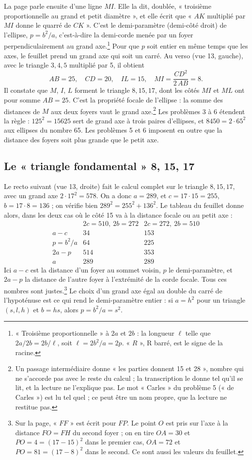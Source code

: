 \documentclass[11pt,a4paper]{article}
\begin{document}
La page parle ensuite d'une ligne \(MI\). Elle la dit, doublée, « troisième
proportionnelle au grand et petit diamètre », et elle écrit que « \(AK\)
multiplié par \(MI\) donne le quarré de \(CK\) ». C'est le demi-paramètre
(demi-côté droit) de l'ellipse, \(p=b^2/a\), c'est-à-dire la demi-corde menée
par un foyer perpendiculairement au grand axe.\footnote{« Troisième
proportionnelle » à \(2a\) et \(2b\) : la longueur \(\ell\) telle que
\(2a/2b=2b/\ell\), soit \(\ell=2b^2/a=2p\). « \(R\) », R barré, est le signe de
la racine.} Pour que \(p\) soit entier en même temps que les axes, le feuillet
prend un grand axe qui soit un carré. Au verso (vue 13, gauche), avec le
triangle \(3,4,5\) multiplié par 5, il obtient
\[
AB=25,\quad CD=20,\quad IL=15,\quad MI=\frac{CD^2}{2\,AB}=8 .
\]
Il constate que \(M\), \(I\), \(L\) forment le triangle \(8,15,17\), dont les
côtés \(MI\) et \(ML\) ont pour somme \(AB=25\). C'est la propriété focale de
l'ellipse : la somme des distances de \(M\) aux deux foyers vaut le grand
axe.\footnote{Un passage intermédiaire donne « les parties donnent 15 et 28 »,
nombre qui ne s'accorde pas avec le reste du calcul ; la transcription le donne
tel qu'il se lit, et la lecture ne l'explique pas. Le mot « Carles » du
problème 5 (« de Carles ») est lu tel quel ; ce peut être un nom propre, que
la lecture ne restitue pas.} Les problèmes 3 à 6 étendent la règle : \(125^2
=15625\) sert de grand axe à trois paires d'ellipses, et \(8450=2\cdot65^2\)
aux ellipses du nombre 65. Les problèmes 5 et 6 imposent en outre que la
distance des foyers soit plus grande que le petit axe.

\subsection*{Le « triangle fondamental » 8, 15, 17}

Le recto suivant (vue 13, droite) fait le calcul complet sur le triangle
\(8,15,17\), avec un grand axe \(2\cdot17^2=578\). On a donc \(a=289\), et
\(c=17\cdot15=255\), \(b=17\cdot8=136\) ; on vérifie bien
\(289^2=255^2+136^2\). Le tableau du feuillet donne alors, dans les deux cas où
le côté 15 va à la distance focale ou au petit axe :
\[
\begin{array}{lcc}
 & 2c=510,\ 2b=272 & 2c=272,\ 2b=510\\
\hline
a-c & 34 & 153\\
p=b^2/a & 64 & 225\\
2a-p & 514 & 353\\
a & 289 & 289
\end{array}
\]
Ici \(a-c\) est la distance d'un foyer au sommet voisin, \(p\) le demi-paramètre,
et \(2a-p\) la distance de l'autre foyer à l'extrémité de la corde focale.
Tous ces nombres sont justes.\footnote{Sur la page, « \(FF\) » est écrit pour
\(FP\). Le point \(O\) est pris sur l'axe à la distance \(FO=FH\) du second
foyer ; on en tire \(OA=30\) et \(PO=4=(17-15)^2\) dans le premier cas,
\(OA=72\) et \(PO=81=(17-8)^2\) dans le second. Ce sont aussi les valeurs du
feuillet.} Le choix d'un grand axe égal au double du carré de l'hypoténuse
est ce qui rend le demi-paramètre entier : si \(a=h^2\) pour un triangle
\((s,l,h)\) et \(b=hs\), alors \(p=b^2/a=s^2\).
\end{document}
